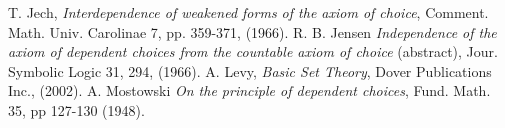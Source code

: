 \documentclass[12pt]{article}
\begin{document}
\begin{thebibliography}{9}
 T. Jech, {\em Interdependence of weakened forms of the axiom of choice}, Comment. Math. Univ. Carolinae 7, pp. 359-371, (1966).
 R. B. Jensen {\em Independence of the axiom of dependent choices from the countable axiom of choice} (abstract), Jour. Symbolic Logic 31, 294, (1966).
 A. Levy, {\em Basic Set Theory}, Dover Publications Inc., (2002).
 A. Mostowski {\em On the principle of dependent choices}, Fund. Math. 35, pp 127-130 (1948).
\end{thebibliography}
\end{document}
